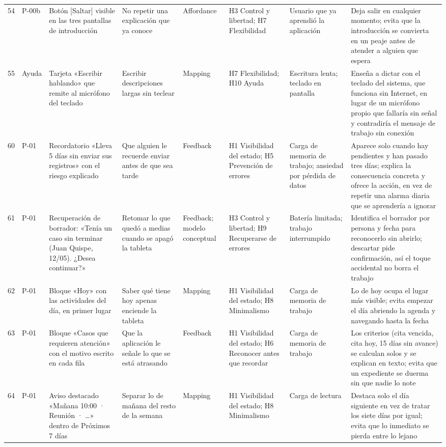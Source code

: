 \begin{longtable}{@{}p{0.6cm}p{1.5cm}p{3.6cm}p{3.4cm}p{2.2cm}p{2.8cm}p{2.3cm}p{4.6cm}@{}}
54 & P-00b & Botón [Saltar] visible en las tres pantallas de introducción & No repetir una explicación que ya conoce & Affordance & H3 Control y libertad; H7 Flexibilidad & Usuario que ya aprendió la aplicación & Deja salir en cualquier momento; evita que la introducción se convierta en un peaje antes de atender a alguien que espera \\
55 & Ayuda & Tarjeta «Escribir hablando» que remite al micrófono del teclado & Escribir descripciones largas sin teclear & Mapping & H7 Flexibilidad; H10 Ayuda & Escritura lenta; teclado en pantalla & Enseña a dictar con el teclado del sistema, que funciona sin Internet, en lugar de un micrófono propio que fallaría sin señal y contradiría el mensaje de trabajo sin conexión \\
60 & P-01 & Recordatorio «Lleva 5 días sin enviar sus registros» con el riesgo explicado & Que alguien le recuerde enviar antes de que sea tarde & Feedback & H1 Visibilidad del estado; H5 Prevención de errores & Carga de memoria de trabajo; ansiedad por pérdida de datos & Aparece solo cuando hay pendientes y han pasado tres días; explica la consecuencia concreta y ofrece la acción, en vez de repetir una alarma diaria que se aprendería a ignorar \\
61 & P-01 & Recuperación de borrador: «Tenía un caso sin terminar (Juan Quispe, 12/05). ¿Desea continuar?» & Retomar lo que quedó a medias cuando se apagó la tableta & Feedback; modelo conceptual & H3 Control y libertad; H9 Recuperarse de errores & Batería limitada; trabajo interrumpido & Identifica el borrador por persona y fecha para reconocerlo sin abrirlo; descartar pide confirmación, así el toque accidental no borra el trabajo \\
62 & P-01 & Bloque «Hoy» con las actividades del día, en primer lugar & Saber qué tiene hoy apenas enciende la tableta & Mapping & H1 Visibilidad del estado; H8 Minimalismo & Carga de memoria de trabajo & Lo de hoy ocupa el lugar más visible; evita empezar el día abriendo la agenda y navegando hasta la fecha \\
63 & P-01 & Bloque «Casos que requieren atención» con el motivo escrito en cada fila & Que la aplicación le señale lo que se está atrasando & Feedback & H1 Visibilidad del estado; H6 Reconocer antes que recordar & Carga de memoria de trabajo & Los criterios (cita vencida, cita hoy, 15 días sin avance) se calculan solos y se explican en texto; evita que un expediente se duerma sin que nadie lo note \\
64 & P-01 & Aviso destacado «Mañana 10:00 · Reunión · …» dentro de Próximos 7 días & Separar lo de mañana del resto de la semana & Mapping & H1 Visibilidad del estado; H8 Minimalismo & Carga de lectura & Destaca solo el día siguiente en vez de tratar los siete días por igual; evita que lo inmediato se pierda entre lo lejano \\

\end{longtable}
